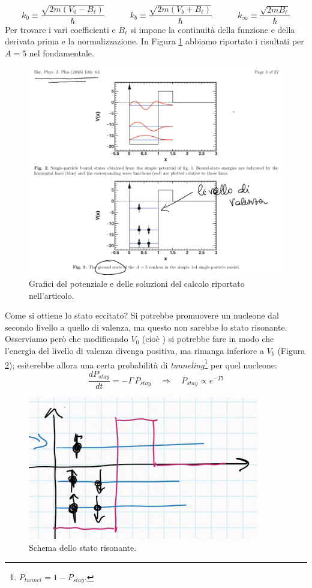 $$k_0 \equiv \frac{\sqrt{2m(V_0-B_\ell)}}{\hbar}\qquad\quad k_b\equiv\frac{\sqrt{2m(V_b+B_\ell)}}{\hbar}\qquad\quad k_\infty\equiv\frac{\sqrt{2mB_\ell}}{\hbar}$$
Per trovare i vari coefficienti e $B_\ell$ si impone la continuità della funzione e della derivata prima e la normalizzazione. In Figura \ref{0325_ris} abbiamo riportato i risultati per $A=5$ nel fondamentale. 
\begin{figure}[!h]
    \centering
    \includegraphics[scale=0.3]{Immagini/0325_risonanza.png}
    \caption{Grafici del potenziale e delle soluzioni del calcolo riportato nell'articolo.}
    \label{0325_ris}
\end{figure}
\noindent Come si ottiene lo stato eccitato? Si potrebbe promuovere un nucleone dal secondo livello a quello di valenza, ma questo non sarebbe lo stato risonante. Osserviamo però che modificando $V_0$ (cioè ) si potrebbe fare in modo che l'energia del livello di valenza divenga positiva, ma rimanga inferiore a $V_b$ (Figura \ref{0325_potris}); esiterebbe allora una certa probabilità di \textit{tunneling}\footnote{$P_{tunnel} = 1 - P_{stay}$.} per quel nucleone:
$$\frac{dP_{stay}}{dt} = -\Gamma \, P_{stay} \quad \Rightarrow \quad P_{stay}\propto e^{-\Gamma t}$$
\begin{figure}[h]
    \centering
    \includegraphics{Immagini/0325_po_risonanza.png}
    \caption{Schema dello stato risonante.}
    \label{0325_potris}
\end{figure}

